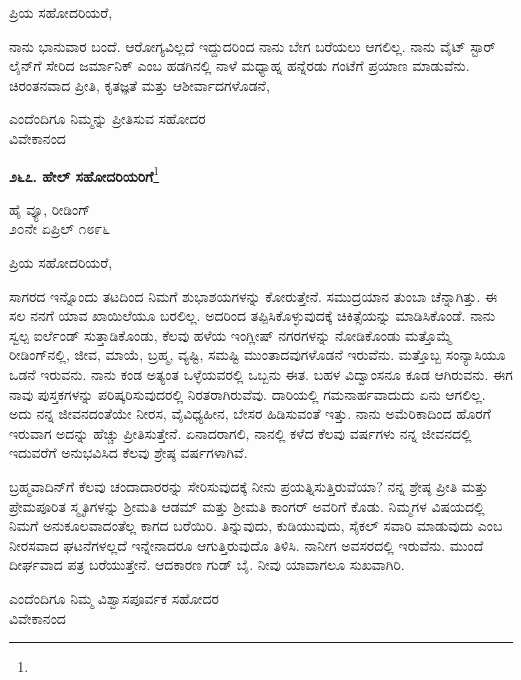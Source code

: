 \noindent
ಪ್ರಿಯ ಸಹೋದರಿಯರೆ,

ನಾನು ಭಾನುವಾರ ಬಂದೆ. ಆರೋಗ್ಯವಿಲ್ಲದೆ ಇದ್ದುದರಿಂದ ನಾನು ಬೇಗ ಬರೆಯಲು ಆಗಲಿಲ್ಲ. ನಾನು ವೈಟ್‌ ಸ್ಟಾರ್‌ ಲೈನ್‌ಗೆ ಸೇರಿದ ಜರ್ಮಾನಿಕ್ ಎಂಬ ಹಡಗಿನಲ್ಲಿ ನಾಳೆ ಮಧ್ಯಾಹ್ನ ಹನ್ನೆರಡು ಗಂಟೆಗೆ ಪ್ರಯಾಣ ಮಾಡುವೆನು. ಚಿರಂತನವಾದ ಪ್ರೀತಿ, ಕೃತಜ್ಞತೆ ಮತ್ತು ಆಶೀರ್ವಾದಗಳೊಡನೆ,

\vspace{-0.5cm}

{\flushright
ಎಂದೆಂದಿಗೂ ನಿಮ್ಮನ್ನು ಪ್ರೀತಿಸುವ ಸಹೋದರ\\ವಿವೇಕಾನಂದ\par}


\begin{center}
\textbf{೨೬೭. ಹೇಲ್ ಸಹೋದರಿಯರಿಗೆ}\footnote{}
\end{center}

\vspace{-0.5cm}

\begin{flushright}
ಹೈ ವ್ಯೂ, ರೀಡಿಂಗ್\\೨೦ನೇ ಏಪ್ರಿಲ್ ೧೮೯೬
\end{flushright}

\vspace{-0.3cm}

\noindent
ಪ್ರಿಯ ಸಹೋದರಿಯರೆ,

ಸಾಗರದ ಇನ್ನೊಂದು ತಟದಿಂದ ನಿಮಗೆ ಶುಭಾಶಯಗಳನ್ನು ಕೋರುತ್ತೇನೆ. ಸಮುದ್ರಯಾನ ತುಂಬಾ ಚೆನ್ನಾಗಿತ್ತು. ಈ ಸಲ ನನಗೆ ಯಾವ ಖಾಯಿಲೆಯೂ ಬರಲಿಲ್ಲ. ಅದರಿಂದ ತಪ್ಪಿಸಿಕೊಳ್ಳುವುದಕ್ಕೆ ಚಿಕಿತ್ಸೆಯನ್ನು ಮಾಡಿಸಿಕೊಂಡೆ. ನಾನು ಸ್ವಲ್ಪ ಐರ್ಲೆಂಡ್ ಸುತ್ತಾಡಿಕೊಂಡು, ಕೆಲವು ಹಳೆಯ ಇಂಗ್ಲೀಷ್ ನಗರಗಳನ್ನು ನೋಡಿಕೊಂಡು ಮತ್ತೊಮ್ಮೆ ರೀಡಿಂಗ್‌ನಲ್ಲಿ, ಜೀವ, ಮಾಯೆ, ಬ್ರಹ್ಮ, ವ್ಯಷ್ಟಿ, ಸಮಷ್ಟಿ ಮುಂತಾದವುಗಳೊಡನೆ ಇರುವೆನು. ಮತ್ತೊಬ್ಬ ಸಂನ್ಯಾಸಿಯೂ ಒಡನೆ ಇರುವನು. ನಾನು ಕಂಡ ಅತ್ಯಂತ ಒಳ್ಳೆಯವರಲ್ಲಿ ಒಬ್ಬನು ಈತ. ಬಹಳ ವಿದ್ವಾಂಸನೂ ಕೂಡ ಆಗಿರುವನು. ಈಗ ನಾವು ಪುಸ್ತಕಗಳನ್ನು ಪರಿಷ್ಕರಿಸುವುದರಲ್ಲಿ ನಿರತರಾಗಿರುವೆವು. ದಾರಿಯಲ್ಲಿ ಗಮನಾರ್ಹವಾದುದು ಏನು ಆಗಲಿಲ್ಲ. ಅದು ನನ್ನ ಜೀವನದಂತೆಯೇ ನೀರಸ, ವೈವಿಧ್ಯಹೀನ, ಬೇಸರ ಹಿಡಿಸುವಂತೆ ಇತ್ತು. ನಾನು ಅಮೆರಿಕಾದಿಂದ ಹೊರಗೆ ಇರುವಾಗ ಅದನ್ನು ಹೆಚ್ಚು ಪ್ರೀತಿಸುತ್ತೇನೆ. ಏನಾದರಾಗಲಿ, ನಾನಲ್ಲಿ ಕಳೆದ ಕೆಲವು ವರ್ಷಗಳು ನನ್ನ ಜೀವನದಲ್ಲಿ ಇದುವರೆಗೆ ಅನುಭವಿಸಿದ ಕೆಲವು ಶ್ರೇಷ್ಠ ವರ್ಷಗಳಾಗಿವೆ.

ಬ್ರಹ್ಮವಾದಿನ್‌ಗೆ ಕೆಲವು ಚಂದಾದಾರರನ್ನು ಸೇರಿಸುವುದಕ್ಕೆ ನೀನು ಪ್ರಯತ್ನಿಸುತ್ತಿರುವೆಯಾ? ನನ್ನ ಶ್ರೇಷ್ಠ ಪ್ರೀತಿ ಮತ್ತು ಪ್ರೇಮಪೂರಿತ ಸ್ಮೃತಿಗಳನ್ನು ಶ‍್ರೀಮತಿ ಆಡಮ್ ಮತ್ತು ಶ‍್ರೀಮತಿ ಕಾಂಗರ್‌ ಅವರಿಗೆ ಕೊಡು. ನಿಮ್ಮಗಳ ವಿಷಯದಲ್ಲಿ ನಿಮಗೆ ಅನುಕೂಲವಾದಂತೆಲ್ಲ ಕಾಗದ ಬರೆಯಿರಿ. ತಿನ್ನುವುದು, ಕುಡಿಯುವುದು, ಸೈಕಲ್ ಸವಾರಿ ಮಾಡುವುದು ಎಂಬ ನೀರಸವಾದ ಘಟನೆಗಳಲ್ಲದೆ ಇನ್ನೇನಾದರೂ ಆಗುತ್ತಿರುವುದೊ ತಿಳಿಸಿ. ನಾನೀಗ ಅವಸರದಲ್ಲಿ ಇರುವೆನು. ಮುಂದೆ ದೀರ್ಘವಾದ ಪತ್ರ ಬರೆಯುತ್ತೇನೆ. ಆದಕಾರಣ ಗುಡ್ ಬೈ. ನೀವು ಯಾವಾಗಲೂ ಸುಖವಾಗಿರಿ.

\begin{flushright}
ಎಂದೆಂದಿಗೂ ನಿಮ್ಮ ವಿಶ್ವಾಸಪೂರ್ವಕ ಸಹೋದರ\\ವಿವೇಕಾನಂದ
\end{flushright}

